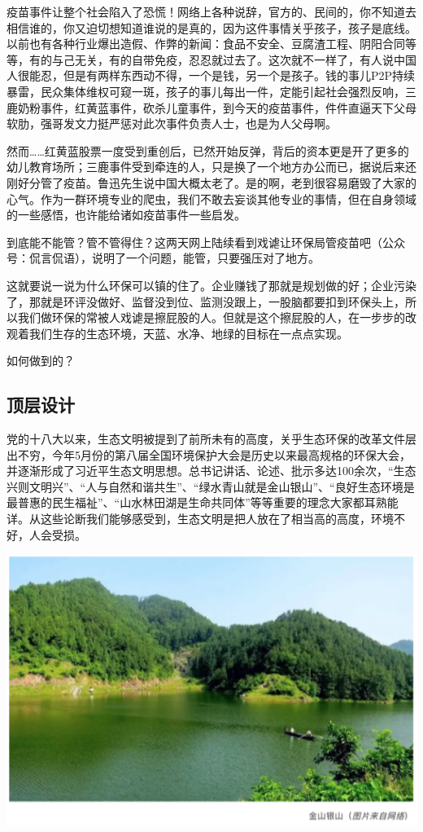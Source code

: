 \documentclass[]{book}
\begin{document}
疫苗事件让整个社会陷入了恐慌！网络上各种说辞，官方的、民间的，你不知道去相信谁的，你又迫切想知道谁说的是真的，因为这件事情关乎孩子，孩子是底线。以前也有各种行业爆出造假、作弊的新闻：食品不安全、豆腐渣工程、阴阳合同等等，有的与己无关，有的自带免疫，忍忍就过去了。这次就不一样了，有人说中国人很能忍，但是有两样东西动不得，一个是钱，另一个是孩子。钱的事儿P2P持续暴雷，民众集体维权可窥一斑，孩子的事儿每出一件，定能引起社会强烈反响，三鹿奶粉事件，红黄蓝事件，砍杀儿童事件，到今天的疫苗事件，件件直逼天下父母软肋，强哥发文力挺严惩对此次事件负责人士，也是为人父母啊。

然而\ldots{}\ldots{}红黄蓝股票一度受到重创后，已然开始反弹，背后的资本更是开了更多的幼儿教育场所；三鹿事件受到牵连的人，只是换了一个地方办公而已，据说后来还刚好分管了疫苗。鲁迅先生说中国大概太老了。是的啊，老到很容易磨毁了大家的心气。作为一群环境专业的爬虫，我们不敢去妄谈其他专业的事情，但在自身领域的一些感悟，也许能给诸如疫苗事件一些启发。

到底能不能管？管不管得住？这两天网上陆续看到戏谑让环保局管疫苗吧（公众号：侃言侃语），说明了一个问题，能管，只要强压对了地方。

这就要说一说为什么环保可以镇的住了。企业赚钱了那就是规划做的好；企业污染了，那就是环评没做好、监督没到位、监测没跟上，一股脑都要扣到环保头上，所以我们做环保的常被人戏谑是擦屁股的人。但就是这个擦屁股的人，在一步步的改观着我们生存的生态环境，天蓝、水净、地绿的目标在一点点实现。

如何做到的？

\subsection{顶层设计}

党的十八大以来，生态文明被提到了前所未有的高度，关乎生态环保的改革文件层出不穷，今年5月份的第八届全国环境保护大会是历史以来最高规格的环保大会，并逐渐形成了习近平生态文明思想。总书记讲话、论述、批示多达100余次，``生态兴则文明兴''、``人与自然和谐共生''、``绿水青山就是金山银山''、``良好生态环境是最普惠的民生福祉''、``山水林田湖是生命共同体''等等重要的理念大家都耳熟能详。从这些论断我们能够感受到，生态文明是把人放在了相当高的高度，环境不好，人会受损。

\includegraphics[width=6.67in]{images/fw2}
\end{document}
